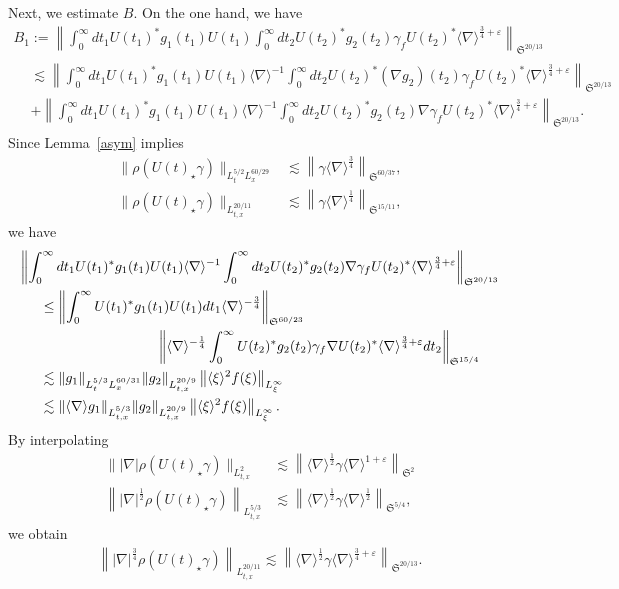 \documentclass[AHL,Unicode,longabstracts,MathTools,published]{cedram}
\newcommand{\FS}{\mathfrak{S}}
\newcommand{\ga}{\gamma}
\newcommand{\ep}{\varepsilon}
\newcommand{\rh}{\rho}
\renewcommand{\No}[1]{\left\| #1 \right\|}
\newcommand{\I}{\infty}
\newcommand{\sd}{\langle \nabla \rangle}
\newcommand{\sdi}{\sd^{-1}}
\newcommand{\lxr}{\langle \xi \rangle}
\newcommand{\tx}{{t,x}}
\newcommand{\st}{\star}
\newcommand{\ft}{{\frac{1}{4}}}
\newcommand{\fh}{\frac{3}{4}}
\newcommand{\tw}{\frac{1}{2}}
\newcommand{\na}{\nabla}
\newcommand{\ls}{\lesssim}
\begin{document}
Next, we estimate $B$. On the one hand, we have
\begin{multline}
B_1:= \No{\int_0^\I dt_1 U(t_1)^* g_1(t_1) U(t_1) \int_0^\I dt_2 U(t_2)^* g_2(t_2)\ga_f U(t_2)^* \sd^{\fh+\ep} }_{\FS^{20/13}} \\
\begin{aligned}
&\ls \No{\int_0^\I dt_1 U(t_1)^* g_1(t_1) U(t_1) \sdi \int_0^\I dt_2 U(t_2)^* (\na g_2)(t_2)\ga_f U(t_2)^* \sd^{\fh+\ep} }_{\FS^{20/13}} \\
& + \No{\int_0^\I dt_1 U(t_1)^* g_1(t_1) U(t_1) \sdi \int_0^\I dt_2 U(t_2)^* g_2(t_2)\na \ga_f U(t_2)^* \sd^{\fh+\ep} }_{\FS^{20/13}}.
\end{aligned}
\end{multline}
Since Lemma~\ref{asym} implies
\begin{align}
\|\rh(U(t)_\st \ga)\|_{L^{5/2}_t L^{60/29}_x} &\ls \left\|\ga \sd^\fh \right\|_{\FS^{60/37}}, \\
\|\rh(U(t)_\st \ga)\|_{L^{20/11}_\tx} &\ls \left\|\ga \sd^{\ft}\right\|_{\FS^{15/11}},
\end{align}
we have
\begin{multline}
\No{\int_0^\I dt_1 U(t_1)^* g_1(t_1) U(t_1) \sdi \int_0^\I dt_2 U(t_2)^* g_2(t_2)\na \ga_f U(t_2)^* \sd^{\fh+\ep} }_{\FS^{20/13}} \\
\begin{aligned}
&\le \No{\int_0^\I U(t_1)^* g_1(t_1) U(t_1) dt_1 \sd^{-\fh}}_{\FS^{60/23}}\\
&\mkern150mu
\No{\sd^{-\ft} \int_0^\I U(t_2)^* g_2(t_2)\ga_f \na U(t_2)^* \sd^{\fh+\ep} dt_2 }_{\FS^{15/4}} \\
&\ls \|g_1\|_{L^{5/3}_t L^{60/31}_x} \|g_2\|_{L^{20/9}_\tx} \left\|\lxr^{2} f(\xi)\right\|_{L^\I_\xi}\\
&\ls \|\sd g_1\|_{L^{5/3}_\tx} \|g_2\|_{L^{20/9}_\tx} \left\|\lxr^{2} f(\xi)\right\|_{L^\I_\xi}.
\end{aligned}
\end{multline}
By interpolating
\begin{align}
\||\na| \rh(U(t)_\st \ga)\|_{L^2_\tx} &\ls \left\|\sd^\tw \ga \sd^{1+\ep}\right\|_{\FS^2} \\
\left\||\na|^{\tw}\rh(U(t)_\st \ga)\right\|_{L^{5/3}_\tx} &\ls \left\|\sd^\tw \ga \sd^\tw \right\|_{\FS^{5/4}},
\end{align}
we obtain
\begin{align}
\left\||\na|^\frac{3}{4} \rh(U(t)_\st \ga)\right\|_{L^{20/11}_\tx} \ls \left\|\sd^\tw \ga \sd^{\frac{3}{4} + \ep}\right\|_{\FS^{20/13}}.
\end{align}
\end{document}
